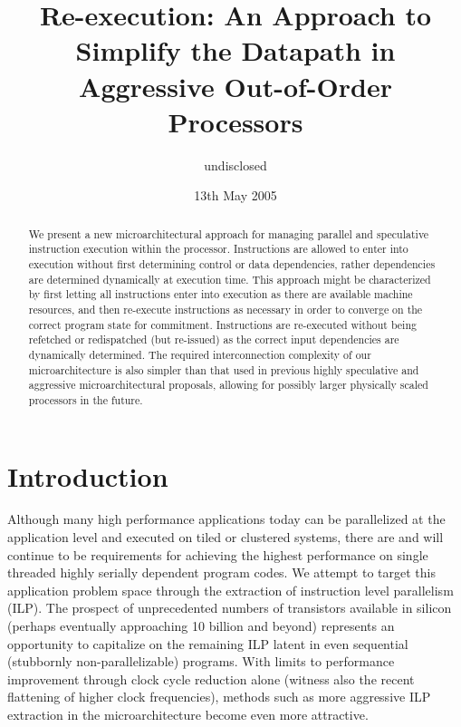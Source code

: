 \documentclass[10pt,twocolumn,dvips]{article}
\begin{document}
%
%
\title{Re-execution: An Approach to Simplify the Datapath in
Aggressive Out-of-Order Processors}
%
%
\author{
undisclosed
}
%
%
\date{13th May 2005}
%
\maketitle
%
%
%
\begin{abstract}
%
We present a new microarchitectural approach
for managing parallel and speculative instruction execution
within the processor.  
Instructions are allowed to enter into
execution without first determining control or data dependencies,
rather dependencies are 
determined dynamically at execution time.
This approach might be
characterized by first letting all instructions enter
into execution as there are available machine resources,
and then re-execute instructions as necessary in order
to converge on the correct program state for commitment.
Instructions are re-executed without being refetched or redispatched
(but re-issued)
as the correct input
dependencies are dynamically determined.
The required interconnection complexity of our microarchitecture
is also simpler than that used in previous highly speculative
and aggressive microarchitectural proposals, allowing for
possibly larger physically scaled processors in the future.
%
\end{abstract}
%
%
\vspace{-0.15in}
\section{Introduction}
%
Although many high performance applications today
can be parallelized at the application level 
and executed on tiled or clustered systems,
there are and will continue
to be requirements for achieving the highest performance
on single threaded highly serially dependent program codes.
We attempt to target this application problem space
through the extraction of instruction level parallelism (ILP).
The prospect of unprecedented numbers of transistors 
available in silicon (perhaps eventually approaching 10 billion
and beyond) represents an opportunity to capitalize on
the remaining ILP latent in even sequential (stubbornly non-parallelizable)
programs.
With limits to performance improvement through clock cycle reduction
alone (witness also the recent flattening of higher clock frequencies),
methods such as more aggressive ILP extraction in the microarchitecture
become even more attractive.
\end{document}
